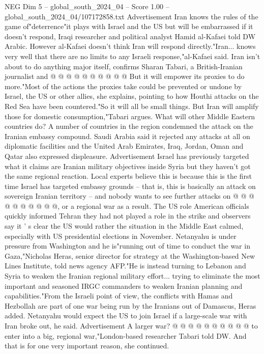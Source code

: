 \begin{textsample}{NEG Dim 5 – global\_south\_2024\_04 – Score 1.00 – global\_south\_2024\_04/107172858.txt}
Advertisement Iran knows the rules of the game of"deterrence"it plays with Israel and the US but will be embarrassed if it doesn't respond, Iraqi researcher and political analyst Hamid al-Kafaei told DW Arabic.
However al-Kafaei doesn't think Iran will respond directly."Iran... knows very well that there are no limits to any Israeli response,"al-Kafaei said.
Iran isn't about to do anything major itself, confirms Sharan Tabari, a British-Iranian journalist and @ @ @ @ @ @ @ @ @ @ But it will empower its proxies to do more."Most of the actions the proxies take could be prevented or undone by Israel, the US or other allies, she explains, pointing to how Houthi attacks on the Red Sea have been countered."So it will all be small things.
But Iran will amplify those for domestic consumption,"Tabari argues.
What will other Middle Eastern countries do?
A number of countries in the region condemned the attack on the Iranian embassy compound.
Saudi Arabia said it rejected any attacks at all on diplomatic facilities and the United Arab Emirates, Iraq, Jordan, Oman and Qatar also expressed displeasure.
Advertisement Israel has previously targeted what it claims are Iranian military objectives inside Syria but they haven't got the same regional reaction.
Local experts believe this is because this is the first time Israel has targeted embassy grounds -- that is, this is basically an attack on sovereign Iranian territory -- and nobody wants to see further attacks on @ @ @ @ @ @ @ @ @ @, or a regional war as a result.
The US role American officials quickly informed Tehran they had not played a role in the strike and observers say it ' s clear the US would rather the situation in the Middle East calmed, especially with US presidential elections in November.
Netanyahu is under pressure from Washington and he is"running out of time to conduct the war in Gaza,"Nicholas Heras, senior director for strategy at the Washington-based New Lines Institute, told news agency AFP."He is instead turning to Lebanon and Syria to weaken the Iranian regional military effort... trying to eliminate the most important and seasoned IRGC commanders to weaken Iranian planning and capabilities."From the Israeli point of view, the conflicts with Hamas and Hezbollah are part of one war being run by the Iranians out of Damascus, Heras added.
Netanyahu would expect the US to join Israel if a large-scale war with Iran broke out, he said.
Advertisement A larger war? @ @ @ @ @ @ @ @ @ @ to enter into a big, regional war,"London-based researcher Tabari told DW.
And that is for one very important reason, she continued.

\end{textsample}

